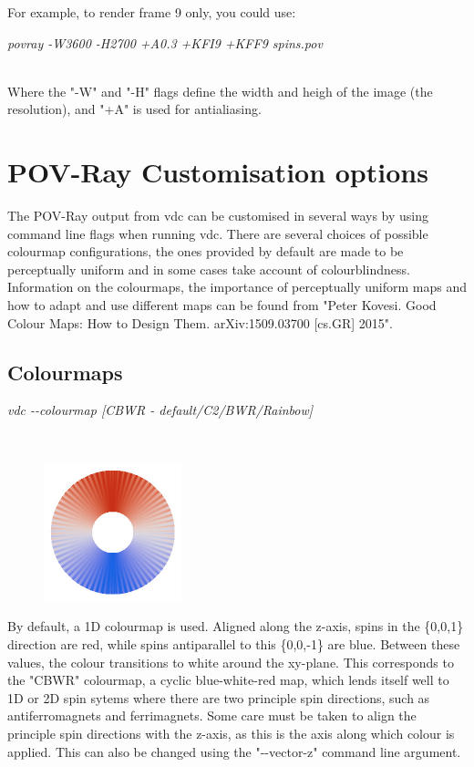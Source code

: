 For example, to render frame 9 only, you could use:

\begin{minipage}[c]{\textwidth}
\centering
\textit{povray -W3600 -H2700 +A0.3 +KFI9 +KFF9 spins.pov}
\end{minipage}\\

Where the "-W" and "-H" flags define the width and heigh of the image (the resolution), and "+A" is used for antialiasing. \\

\section*{POV-Ray Customisation options}
The POV-Ray output from vdc can be customised in several ways by using command line flags when running vdc. There are several choices of possible colourmap configurations, the ones provided by default are made to be perceptually uniform and in some cases take account of colourblindness. Information on the colourmaps, the importance of perceptually uniform maps and how to adapt and use different maps can be found from "Peter Kovesi. Good Colour Maps: How to Design Them. arXiv:1509.03700 [cs.GR] 2015". \\

\subsection*{Colourmaps}

\begin{minipage}[c]{\textwidth}
\centering
\textit{vdc -{}-colourmap [CBWR - default/C2/BWR/Rainbow]}
\end{minipage}\\

\begin{figure}[!h]
\center
\includegraphics[width=4cm]{figures/CBWR_colourmap.jpg}
\label{fig:CBWR_colourmap}
\end{figure}

By default, a 1D colourmap is used. Aligned along the z-axis, spins in the \{0,0,1\} direction are red, while spins antiparallel to this \{0,0,-1\} are blue. Between these values, the colour transitions to white around the xy-plane. This corresponds to the "CBWR" colourmap, a cyclic blue-white-red map, which lends itself well to 1D or 2D spin sytems where there are two principle spin directions, such as antiferromagnets and ferrimagnets. Some care must be taken to align the principle spin directions with the z-axis, as this is the axis along which colour is applied. This can also be changed using the "-{}-vector-z" command line argument.   \\

